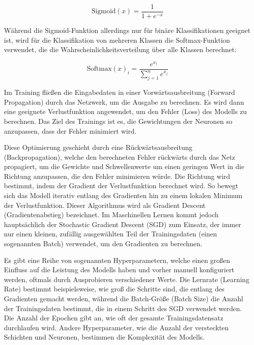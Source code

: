 \begin{equation}
	\text{Sigmoid}(x) = \frac{1}{1 + e^{-x}}
	\label{eq:sigmoid}
\end{equation}

Während die Sigmoid-Funktion allerdings nur für binäre Klassifikationen geeignet ist, wird für die Klassifikation von mehreren Klassen die Softmax-Funktion verwendet, die die Wahrscheinlichkeitsverteilung über alle Klassen berechnet:

\begin{equation}
	\text{Softmax}(x)_i = \frac{e^{x_i}}{\sum_{j=1}^{n} e^{x_j}}
	\label{eq:softmax}
\end{equation}

Im Training fließen die Eingabedaten in einer Vorwärtsausbreitung (Forward Propagation) durch das Netzwerk, um die Ausgabe zu berechnen. Es wird dann eine geeignete Verlustfunktion angewendet, um den Fehler (Loss) des Modells zu berechnen. Das Ziel des Trainings ist es, die Gewichtungen der Neuronen so anzupassen, dass der Fehler minimiert wird.

Diese Optimierung geschieht durch eine Rückwärtsausbreitung (Backpropagation), welche den berechneten Fehler rückwärts durch das Netz propagiert, um die Gewichte und Schwellenwerte um einen geringen Wert in die Richtung anzupassen, die den Fehler minimieren würde. Die Richtung wird bestimmt, indem der Gradient der Verlustfunktion berechnet wird. So bewegt sich das Modell iterativ entlang des Gradienten hin zu einem lokalen Minimum der Verlustfunktion. Dieser Algorithmus wird als Gradient Descent (Gradientenabstieg) bezeichnet. Im Maschinellen Lernen kommt jedoch hauptsächlich der Stochastic Gradient Descent (SGD) zum Einsatz, der immer nur einen kleinen, zufällig ausgewählten Teil der Trainingsdaten (einen sogenannten Batch) verwendet, um den Gradienten zu berechnen. %

Es gibt eine Reihe von sogenannten Hyperparametern, welche einen großen Einfluss auf die Leistung des Modells haben und vorher manuell konfiguriert werden, oftmals durch Ausprobieren verschiedener Werte. Die Lernrate (Learning Rate) bestimmt beispielsweise, wie groß die Schritte sind, die entlang des Gradienten gemacht werden, während die Batch-Größe (Batch Size) die Anzahl der Trainingsdaten bestimmt, die in einem Schritt des SGD verwendet werden. Die Anzahl der Epochen gibt an, wie oft der gesamte Trainingsdatensatz durchlaufen wird. Andere Hyperparameter, wie die Anzahl der versteckten Schichten und Neuronen, bestimmen die Komplexität des Modells.

